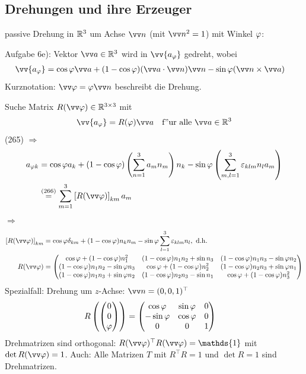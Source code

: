 \documentclass[a4paper]{scrartcl}
\newcommand{\RR}{\ensuremath \mathbb{R}}
\newcommand{\dOne}{\ensuremath \mathds{1}}
\newcommand{\eps}{\ensuremath \varepsilon}
\renewcommand{\phi}{\ensuremath \varphi}
\newcommand{\matr}[1]{\begin{pmatrix} #1 \end{pmatrix}}
\begin{document}
{\subsection{Drehungen und ihre Erzeuger}

passive Drehung in $\RR^3$ um Achse $\vv n$ (mit $\vv n^2 = 1$) mit Winkel $\phi$:

Aufgabe 6e): Vektor $\vv a \in \RR^3$ wird in $\vv {a_\phi}$ gedreht, wobei 
\begin{align}
\vv {a_\phi} & = \cos \phi \vv a + (1 - \cos \phi) ( \vv a \cdot \vv n ) \vv n -  \sin \phi( \vv n \times \vv a)
\end{align}
Kurznotation: $\vv \phi = \phi \vv n$ beschreibt die Drehung.

Suche Matrix $R(\vv \phi) \in\RR^{3 \times 3}$ mit 
\begin{align}
\vv{a_\phi} = R(\phi) \vv a \quad \mathrm{f"ur \ alle \ } \vv a \in \RR^3
\end{align}
(265) $\Longrightarrow$
\begin{align*}
a_{\phi k} & = \cos \phi a_k + (1 - \cos \phi) \left( \sum_{n=1}^3 a_m n_m \right) n_k - \sin \phi \left( \sum_{m,l =1}^3 \eps_{klm} n_l a_m \right) \\
& \stackrel{(266)}= \sum_{m=1}^3 \left[ R(\vv \phi) \right] _{km} a_m
\end{align*}
$\Longrightarrow$
\begin{align}
\left[ R( \vv \phi) \right]_{km} & =  \cos \phi \delta_{km} + (1- \cos \phi) n_k n_m - \sin \phi \sum_{l=1}^3 \eps_{klm} n_l, \mathrm{\ d.h.} \\
R(\vv \phi)  & = 
\matr{
\cos \phi + (1- \cos \phi) n_1^2 & (1- \cos \phi) n_1 n_2 + \sin n_3 & (1- \cos \phi) n_1 n_3 - \sin \phi n_2 \\
(1- \cos \phi) n_1 n_2 - \sin \phi n_3 & \cos \phi + (1- \cos \phi) n_2^2 &  (1- \cos \phi) n_2 n_3 + \sin \phi n_1 \\
(1-\cos \phi) n_1 n_3 + \sin \phi n_2 & (1- \cos \phi) n_2 n_3 - \sin n_1 & \cos \phi + (1- \cos \phi) n_3^2
}
\end{align}
Spezialfall: Drehung um $z$-Achse: $\vv n = (0, 0, 1)^\top$
\begin{align}
R\left( \matr{ 0 \\ 0 \\ \phi } \right) & = \matr{ \cos \phi & \sin \phi & 0 \\ - \sin \phi & \cos \phi & 0 \\ 0 & 0 & 1 }
\end{align}
Drehmatrizen sind orthogonal: $R(\vv \phi)^\top R(\vv \phi) = \dOne$ mit $\det R(\vv \phi) = 1$. Auch: Alle Matrizen $T$ mit $R^\top R = 1$ und $\det R = 1$ sind Drehmatrizen.

}
\end{document}
